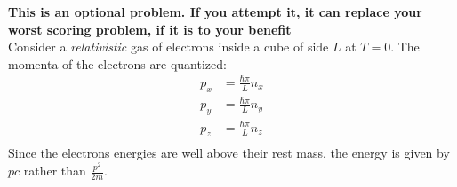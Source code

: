 \question \textbf{This is an optional problem. If you attempt it, it can replace your worst scoring problem, if it is to your benefit}\\Consider a \textit{relativistic} gas of electrons inside a cube of side $L$ at $T=0$. The momenta of the electrons are quantized:
\begin{align*}
	p_x&=\frac{\hbar\pi}{L}n_x\\
	p_y&=\frac{\hbar\pi}{L}n_y\\
	p_z&=\frac{\hbar\pi}{L}n_z\\
\end{align*}
Since the electrons energies are well above their rest mass, the energy is given by $pc$ rather than $\frac{p^2}{2m}$.

